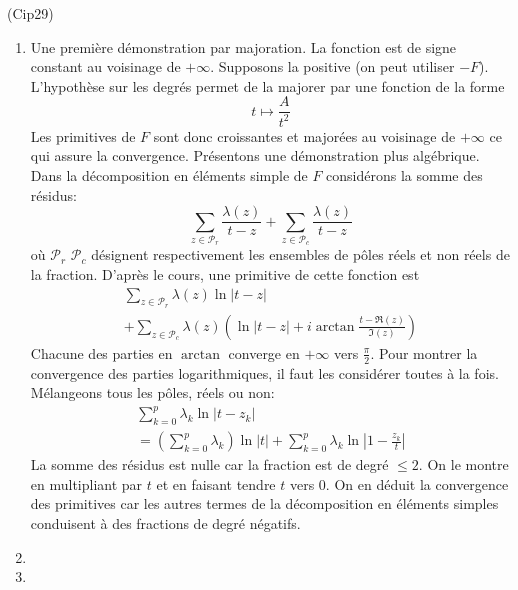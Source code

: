 \begin{tiny}(Cip29)\end{tiny}
\begin{enumerate}
 \item Une première démonstration par majoration. La fonction est de signe constant au voisinage de $+\infty$. Supposons la positive (on peut utiliser $-F$). L'hypothèse sur les degrés permet de la majorer par une fonction de la forme
\begin{displaymath}
 t\mapsto \frac{A}{t^2}
\end{displaymath}
Les primitives de $F$ sont donc croissantes et majorées au voisinage de $+\infty$ ce qui assure la convergence.\newline
Présentons une démonstration plus algébrique. 
Dans la décomposition en éléments simple de $F$ considérons la somme des résidus:
\begin{displaymath}
 \sum _{z\in \mathcal{P}_r}\frac{\lambda(z)}{t-z} 
+ \sum _{z\in \mathcal{P}_c}\frac{\lambda(z)}{t-z}
\end{displaymath}
où $\mathcal{P}_r$ $\mathcal{P}_c$ désignent respectivement les ensembles de pôles réels et non réels de la fraction.
D'après le cours, une primitive de cette fonction est
\begin{multline*}
 \sum _{z\in \mathcal{P}_r}\lambda(z) \ln|t-z| \\
+ \sum _{z\in \mathcal{P}_c}\lambda(z)\left(  \ln|t-z|+i\arctan\frac{t-\Re(z)}{\Im(z)}\right) 
\end{multline*}
Chacune des parties en $\arctan$ converge en $+\infty$ vers $\frac{\pi}{2}$. Pour montrer la convergence des parties logarithmiques, il faut les considérer toutes à la fois. Mélangeons tous les pôles, réels ou non:
\begin{multline*}
 \sum_{k=0}^{p}\lambda_k\ln|t-z_k| \\
= \left( \sum_{k=0}^{p}\lambda_k\right) \ln|t|
+ \sum_{k=0}^{p}\lambda_k\ln|1-\frac{z_k}{t}|
\end{multline*}
La somme des résidus est nulle car la fraction est de degré $\leq 2$. On le montre en multipliant par $t$ et en faisant tendre $t$ vers $0$. On en déduit la convergence des primitives car les autres termes de la décomposition en éléments simples conduisent à des fractions de degré négatifs.
 \item
 \item 
\end{enumerate}
 